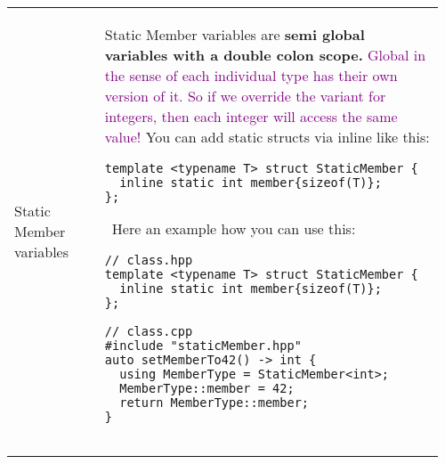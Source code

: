 \documentclass[main.tex,fontsize=8pt,paper=a4,paper=portrait,DIV=calc]{scrartcl}
\begin{document}
\begin{table}[ht!]
\begin{tabular}{|m{0.2\linewidth}|m{0.755\linewidth}|}
\hline
Static Member variables &
Static Member variables are \textbf{semi global variables with a double colon scope.}\newline
\textcolor{purple}{Global in the sense of each individual type has their own version of it. So if we override the variant for integers, then each integer will access the same value!}\newline
You can add static structs via inline like this: \newline
\begin{lstlisting}
template <typename T> struct StaticMember {
  inline static int member{sizeof(T)};
};
\end{lstlisting}
\, \newline
Here an example how you can use this: \newline
\begin{lstlisting}
// class.hpp
template <typename T> struct StaticMember {
  inline static int member{sizeof(T)};
};

// class.cpp
#include "staticMember.hpp"
auto setMemberTo42() -> int {
  using MemberType = StaticMember<int>;
  MemberType::member = 42;
  return MemberType::member;
}


\end{lstlisting}
\end{tabular}
\end{table}
\end{document}
